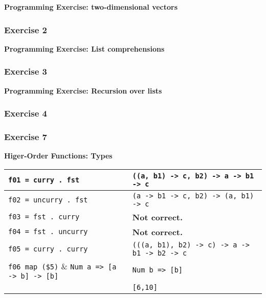 \textbf{Programming Exercise: two-dimensional vectors}\\

\newpage
\begin{multicols}{2}

\subsubsection{Exercise 2}

\end{multicols}
\textbf{Programming Exercise: List comprehensions}\\

\newpage
\begin{multicols}{2}

\subsubsection{Exercise 3}

\end{multicols}
\textbf{Programming Exercise: Recursion over lists}\\

\newpage
\begin{multicols}{2}

\subsubsection{Exercise 4}


\end{multicols}
\subsubsection{Exercise 7}

\textbf{Higer-Order Functions: Types}\\
\begin{tabularx}{\linewidth}{|X|X|}
  \hline
  \lstinline|f01 = curry . fst| & \lstinline|((a, b1) -> c, b2) -> a -> b1 -> c|\\
  \hline
  \lstinline|f02 = uncurry . fst| & \lstinline|(a -> b1 -> c, b2) -> (a, b1) -> c|\\
  \hline
  \lstinline|f03 = fst . curry| & \textbf{Not correct.}\\
  \hline
  \lstinline|f04 = fst . uncurry| & \textbf{Not correct.}\\
  \hline
  \lstinline|f05 = curry . curry| & \lstinline|(((a, b1), b2) -> c) -> a -> b1 -> b2 -> c|\\
  \hline
  \lstinline|f06 map ($5)| & \lstinline|Num a => [a -> b] -> [b]|\\
  \hline
  \lstinline|v07 = map ($5) [(+1), (*2)| & \lstinline|Num b => [b]|\\
   & \lstinline|[6,10]|\\
  \hline
\end{tabularx}

